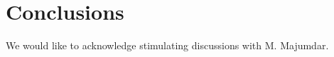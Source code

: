 \documentclass[aps,showpacs,twocolumn,floatfix,prx,superscriptaddress]{revtex4-1}
\begin{document}
\section{Conclusions}

\begin{acknowledgments}
We would like to acknowledge stimulating discussions with M. Majumdar.\end{acknowledgments}


\end{document}

